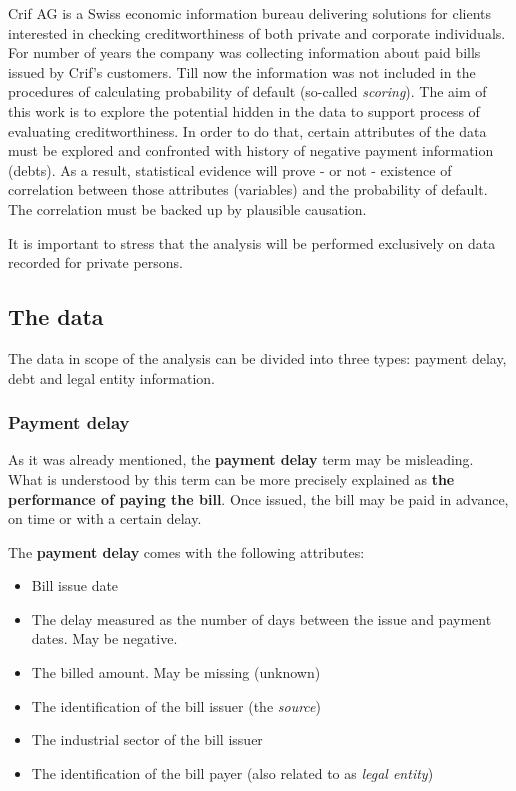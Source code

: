 \documentclass{article}
\begin{document}
Crif AG is a Swiss economic information bureau delivering solutions for clients interested in checking creditworthiness of both private and corporate individuals.
For number of years the company was collecting information about paid bills issued by Crif's customers.
Till now the information was not included in the procedures of calculating probability of default (so-called \textit{scoring}).
The aim of this work is to explore the potential hidden in the data to support process of evaluating creditworthiness.
In order to do that, certain attributes of the data must be explored and confronted with history of negative payment information (debts).
As a result, statistical evidence will prove - or not - existence of correlation between those attributes (variables)
and the probability of default. The correlation must be backed up by plausible causation.\par

It is important to stress that the analysis will be performed exclusively on data recorded for private persons.\par

\subsection{The data}

The data in scope of the analysis can be divided into three types: payment delay, debt and legal entity information.

\subsubsection{Payment delay}

As it was already mentioned, the \textbf{payment delay} term may be misleading.
What is understood by this term can be more precisely explained as \textbf{the performance of paying the bill}.
Once issued, the bill may be paid in advance, on time or with a certain delay.\par
\vspace{5pt}
The \textbf{payment delay} comes with the following attributes:
\begin{itemize}
    \item Bill issue date
    \item The delay measured as the number of days between the issue and payment dates. May be negative.
    \item The billed amount. May be missing (unknown)
    \item The identification of the bill issuer (the \textit{source})
    \item The industrial sector of the bill issuer
    \item The identification of the bill payer (also related to as \textit{legal entity})
\end{itemize}
\end{document}
